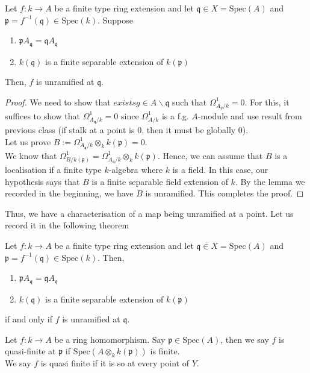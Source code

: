 \documentclass[oneside, 12pt]{scrbook}
\newcommand{\spec}{\mathrm{Spec}}
\newcommand{\pr}{\mathfrak{p}}
\newcommand{\bs}{\backslash}
\theoremstyle{theorem}
\begin{document}
\begin{proposition}
Let $f: k \rightarrow A$ be a finite type ring extension and let $\mathfrak{q} \in X = \spec(A)$ and $\pr = f^{-1}(\mathfrak{q}) \in \spec(k)$. Suppose 
\begin{enumerate}
\item $\pr A_{\mathfrak{q}} = \mathfrak{q}A_{\mathfrak{q}}$
\item $k(\mathfrak{q})$ is a finite separable extension of $k(\pr)$
\end{enumerate}
Then, $f$ is unramified at $\mathfrak{q}$.
\end{proposition}

\begin{proof}
We need to show that $exists g \in A\bs \mathfrak{q}$ such that $\Omega_{A_{g}/k}^{1}=0$. For this, it suffices to show that $\Omega_{A_{\mathfrak{q}}/k}^{1}=0$ since $\Omega_{A/k}^{1}$ is a f.g. $A$-module and use result from previous class (if stalk at a point is $0$, then it must be globally $0$).\\

Let us prove $B:=\Omega_{A_{\mathfrak{q}}/k}^{1} \otimes_{k} k(\pr)=0$. \\
We know that $\Omega_{B/k(\pr)}^{1} = \Omega_{A_{\mathfrak{q}}/k}^{1} \otimes_{k} k(\pr)$. Hence, we can assume that $B$ is a localisation if a finite type $k$-algebra where $k$ is a field. In this case, our hypothesis says that $B$ is a finite separable field extension of $k$. By the lemma we recorded in the beginning, we have $B$ is unramified. This completes the proof.
\end{proof}

Thus, we have a characterisation of a map being unramified at a point. Let us record it in the following theorem
\begin{theorem}
Let $f: k \rightarrow A$ be a finite type ring extension and let $\mathfrak{q} \in X = \spec(A)$ and $\pr = f^{-1}(\mathfrak{q}) \in \spec(k)$. Then, 
\begin{enumerate}
\item $\pr A_{\mathfrak{q}} = \mathfrak{q}A_{\mathfrak{q}}$
\item $k(\mathfrak{q})$ is a finite separable extension of $k(\pr)$
\end{enumerate}
if and only if $f$ is unramified at $\mathfrak{q}$.
\end{theorem}

\begin{definition}
Let $f: k \rightarrow A$ be a ring homomorphism. Say $\pr \in \spec(A)$, then we say $f$ is quasi-finite at $\pr$ if $\spec(A\otimes_{k} k(\pr))$ is finite. \\

We say $f$ is quasi finite if it is so at every point of $Y$.
\end{definition}
\end{document}
